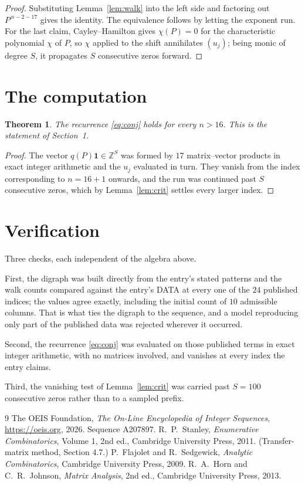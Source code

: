 \documentclass[11pt,a4paper]{article}
\theoremstyle{plain}
\newtheorem{theorem}{Theorem}
\theoremstyle{definition}
\begin{document}
\begin{proof}
Substituting Lemma~\ref{lem:walk} into the left side and factoring out
$P^{\,n-2-17}$ gives the identity. The equivalence follows by letting the exponent
run. For the last claim, Cayley--Hamilton gives $\chi(P)=0$ for the characteristic
polynomial $\chi$ of $P$, so $\chi$ applied to the shift annihilates $(u_j)$; being monic of
degree $S$, it propagates $S$ consecutive zeros forward.
\end{proof}

\section{The computation}

\begin{theorem}
The recurrence \eqref{eq:conj} holds for every $n>16$. This is the statement of
Section~1.
\end{theorem}

\begin{proof}
The vector $q(P)\mathbf{1}\in\mathbb{Z}^{S}$ was formed by $17$ matrix--vector
products in exact integer arithmetic and the $u_j$ evaluated in turn. They vanish from the
index corresponding to $n=16+1$ onwards, and the run was continued past $S$ consecutive
zeros, which by Lemma~\ref{lem:crit} settles every larger index.
\end{proof}

\section{Verification}

Three checks, each independent of the algebra above.

First, the digraph was built directly from the entry's stated patterns and the walk counts
compared against the entry's DATA at every one of the $24$ published indices; the
values agree exactly, including the initial count of $10$ admissible columns. That is
what ties the digraph to the sequence, and a model reproducing only part of the published
data was rejected wherever it occurred.

Second, the recurrence \eqref{eq:conj} was evaluated on those published terms in exact
integer arithmetic, with no matrices involved, and vanishes at every index the entry claims.

Third, the vanishing test of Lemma~\ref{lem:crit} was carried past $S=100$ consecutive
zeros rather than to a sampled prefix.

\begin{thebibliography}{9}
 The OEIS Foundation, \emph{The On-Line Encyclopedia of Integer
Sequences}, \url{https://oeis.org}, 2026. Sequence A207897.
 R.~P.~Stanley, \emph{Enumerative Combinatorics}, Volume 1, 2nd ed.,
Cambridge University Press, 2011. (Transfer-matrix method, Section 4.7.)
 P.~Flajolet and R.~Sedgewick, \emph{Analytic Combinatorics}, Cambridge
University Press, 2009.
 R.~A.~Horn and C.~R.~Johnson, \emph{Matrix Analysis}, 2nd ed., Cambridge
University Press, 2013.
\end{thebibliography}
\end{document}
